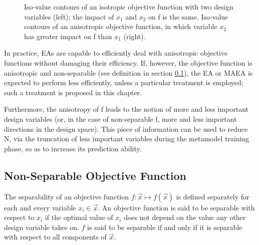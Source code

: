 \begin{figure}[h!]
\begin{minipage}[b]{1.0\linewidth}
 \centering
\end{minipage}
\caption{Iso-value contours of an isotropic objective function with two design variables (left); the impact of $x_1$ and $x_2$ on f is the same. Iso-value contours of an anisotropic objective function, in which variable $x_2$ has greater impact on f than $x_1$ (right).} 
\label{illc}
\end{figure}

In practice, EAs are capable to efficiently deal with anisotropic objective functions without damaging their efficiency. If, however, the objective function is anisotropic and non-separable (see definition in section \ref{Nonsep}), the EA or MAEA is expected to perform less efficiently, unless a particular treatment is employed; such a treatment is proposed in this chapter.  

Furthermore, the anisotropy of f leads to the notion of more and less important design variables (or, in the case of non-separable f, more and less important directions in the design space). This piece of information can be used to reduce N, via the truncation of less important variables during the metamodel training phase, so as to increase its prediction ability.       


\subsection{Non-Separable Objective Function}     
\label{Nonsep}
The separability of an objective function $f:\vec{x}\mapsto f(\vec{x})$ is defined separately for each and every variable $x_i \in \vec{x}$. An objective function is said to be separable with respect to $x_i$ if the optimal value of $x_i$ does not depend on the value  any other design variable takes on. $f$ is said to be separable if and only if it is separable with respect to all components of $\vec{x}$.


